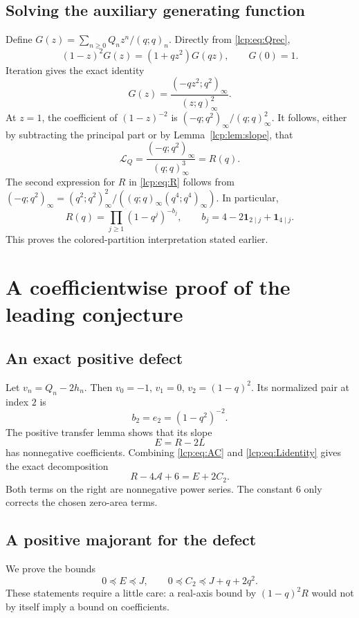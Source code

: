 \documentclass[11pt]{article}
\numberwithin{equation}{section}
\theoremstyle{definition}\newtheorem{definition}[theorem]{Definition}
\theoremstyle{remark}\newtheorem{remark}[theorem]{Remark}
\newcommand{\pp}[1]{(q;q)_{#1}}
\newcommand{\Acal}{\mathcal A}
\newcommand{\Lcal}{\mathcal L}
\newcommand{\pre}{\preccurlyeq}
\begin{document}
\subsection{Solving the auxiliary generating function}
Define $G(z)=\sum_{n\ge0}Q_nz^n/\pp n$. Directly from
\eqref{lcp:eq:Qrec},
\[
 (1-z)^2G(z)=(1+qz^2)G(qz),\qquad G(0)=1.
\]
Iteration gives the exact identity
\begin{equation}\label{lcp:eq:Gproduct}
 G(z)=\frac{(-qz^2;q^2)_\infty}{(z;q)_\infty^2}.
\end{equation}
At $z=1$, the coefficient of $(1-z)^{-2}$ is
$(-q;q^2)_\infty/\pp\infty^2$. It follows, either by subtracting the
principal part or by Lemma~\ref{lcp:lem:slope}, that
\begin{equation}\label{lcp:eq:Qproduct}
 \Lcal_Q=\frac{(-q;q^2)_\infty}{\pp\infty^3}=R(q).
\end{equation}
The second expression for $R$ in \eqref{lcp:eq:R} follows from
$(-q;q^2)_\infty=(q^2;q^2)_\infty^2/
((q;q)_\infty(q^4;q^4)_\infty)$.
In particular,
\begin{equation}\label{lcp:eq:colors}
 R(q)=\prod_{j\ge1}(1-q^j)^{-b_j},\qquad
 b_j=4-2\mathbf1_{2\mid j}+\mathbf1_{4\mid j}.
\end{equation}
This proves the colored-partition interpretation stated earlier.

\section{A coefficientwise proof of the leading conjecture}
\subsection{An exact positive defect}
Let $v_n=Q_n-2h_n$. Then
$v_0=-1$, $v_1=0$, $v_2=(1-q)^2$. Its normalized pair at index $2$ is
\[
 b_2=e_2=(1-q^2)^{-2}.
\]
The positive transfer lemma shows that its slope
\begin{equation}\label{lcp:eq:E}
 E=R-2L
\end{equation}
has nonnegative coefficients. Combining \eqref{lcp:eq:AC} and
\eqref{lcp:eq:Lidentity} gives the exact decomposition
\begin{equation}\label{lcp:eq:defectexact}
 R-4\Acal+6=E+2C_2.
\end{equation}
Both terms on the right are nonnegative power series. The constant $6$
only corrects the chosen zero-area terms.

\subsection{A positive majorant for the defect}
We prove the bounds
\begin{equation}\label{lcp:eq:majorants}
 0\pre E\pre J,
 \qquad 0\pre C_2\pre J+q+2q^2.
\end{equation}
These statements require a little care: a real-axis bound by
$(1-q)^2R$ would not by itself imply a bound on coefficients.
\end{document}
